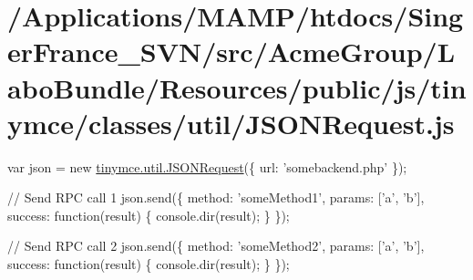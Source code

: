 \hypertarget{_2_applications_2_m_a_m_p_2htdocs_2_singer_france__s_v_n_2src_2_acme_group_2_labo_bundle_2_resouf74975d64a3b42f2f633fb8a55b3157f}{\section{/\+Applications/\+M\+A\+M\+P/htdocs/\+Singer\+France\+\_\+\+S\+V\+N/src/\+Acme\+Group/\+Labo\+Bundle/\+Resources/public/js/tinymce/classes/util/\+J\+S\+O\+N\+Request.\+js}
}
var json = new \hyperlink{classtinymce_1_1util_1_1_j_s_o_n_request}{tinymce.\+util.\+J\+S\+O\+N\+Request}(\{ url\+: 'somebackend.\+php' \});

// Send R\+P\+C call 1 json.\+send(\{ method\+: 'some\+Method1', params\+: \mbox{[}'a', 'b'\mbox{]}, success\+: function(result) \{ console.\+dir(result); \} \});

// Send R\+P\+C call 2 json.\+send(\{ method\+: 'some\+Method2', params\+: \mbox{[}'a', 'b'\mbox{]}, success\+: function(result) \{ console.\+dir(result); \} \});


\begin{DoxyCodeInclude}
\end{DoxyCodeInclude}
 